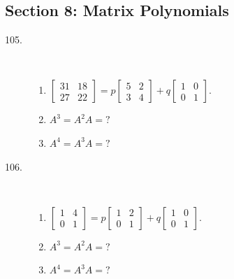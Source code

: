 \documentclass{article}
\begin{document}
\subsection*{Section 8: Matrix Polynomials}

\begin{description}

  \item[105.] $\ $
    \begin{enumerate}[\hspace{1cm}(a)]
      \item $\begin{bmatrix} 31 & 18 \\ 27 &22 \end{bmatrix}  =  p \begin{bmatrix} 5 & 2 \\ 3 & 4 \end{bmatrix}  +  q \begin{bmatrix} 1 & 0 \\ 0 & 1 \end{bmatrix}$.
      \item $A^3 = A^2 A = ?$
      \item $A^4 = A^3 A = ?$
    \end{enumerate}

  \item[106.] $\ $
    \begin{enumerate}[\hspace{1cm}(a)]
      \item $\begin{bmatrix} 1 & 4 \\ 0 & 1 \end{bmatrix}  =  p \begin{bmatrix} 1 & 2 \\ 0 & 1 \end{bmatrix}  +  q \begin{bmatrix} 1 & 0 \\ 0 & 1 \end{bmatrix}$.
      \item $A^3 = A^2 A = ?$
      \item $A^4 = A^3 A = ?$
    \end{enumerate}


\end{description}
\end{document}
